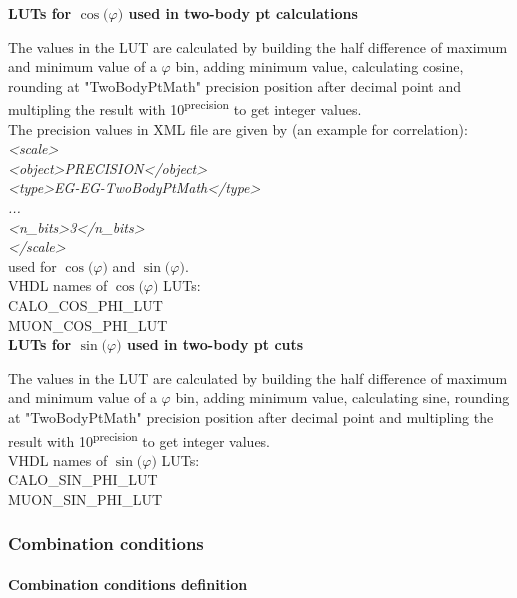 \textbf{LUTs for $\cos($$\varphi$$)$ used in two-body pt calculations}
\label{sec:gtl:calc_luts_cos_phi}

The values in the LUT are calculated by building the half difference of maximum and minimum value of a $\varphi$ bin, adding minimum value, calculating cosine, rounding at "TwoBodyPtMath" precision position after decimal point and multipling the result with 10\textsuperscript{\tiny{precision}} to get integer values.\\

The precision values in XML file are given by (an example for \egamma \egamma correlation):\\
\textit{<scale>\\
    <object>PRECISION</object>\\
    <type>EG-EG-TwoBodyPtMath</type>\\
    ...\\
    <n\_bits>3</n\_bits>\\
</scale>}\\
used for $\cos($$\varphi$$)$ and $\sin($$\varphi$$)$.\\

VHDL names of $\cos($$\varphi$$)$ LUTs:\\
CALO\_COS\_PHI\_LUT\\
MUON\_COS\_PHI\_LUT\\

\textbf{LUTs for $\sin($$\varphi$$)$ used in two-body pt cuts}
\label{sec:gtl:calc_luts_sin_phi}

The values in the LUT are calculated by building the half difference of maximum and minimum value of a $\varphi$ bin, adding minimum value, calculating sine, rounding at "TwoBodyPtMath" precision position after decimal point and multipling the result with 10\textsuperscript{\tiny{precision}} to get integer values.\\

VHDL names of $\sin($$\varphi$$)$ LUTs:\\
CALO\_SIN\_PHI\_LUT\\
MUON\_SIN\_PHI\_LUT\\

\clearpage

\subsubsection{Combination conditions}
\label{sec:gtl:combination_conditions}

\paragraph{Combination conditions definition}
\label{sec:gtl:comb_cond_def}

